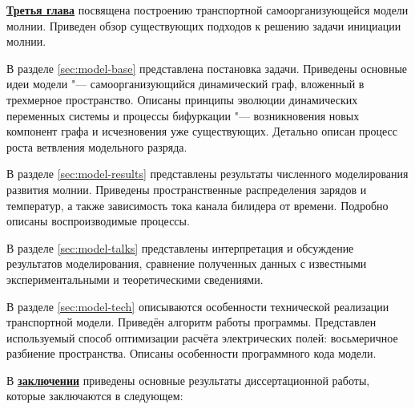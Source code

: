\underline{\textbf{Третья глава}} посвящена построению транспортной самоорганизующейся модели молнии. Приведен обзор существующих подходов к решению задачи инициации молнии.

В разделе \ref{sec:model-base} представлена постановка задачи. Приведены основные идеи модели "--- самоорганизующийся динамический граф, вложенный в трехмерное пространство. Описаны принципы эволюции динамических переменных системы и процессы бифуркации "--- возникновения новых компонент графа и исчезновения уже существующих. Детально описан процесс роста ветвления модельного разряда.

В разделе \ref{sec:model-results} представлены результаты численного моделирования развития молнии. Приведены пространственные распределения зарядов и температур, а также зависимость тока канала билидера от времени. Подробно описаны воспроизводимые процессы.

В разделе \ref{sec:model-talks} представлены интерпретация и обсуждение результатов моделирования, сравнение полученных данных с известными экспериментальными и теоретическими сведениями.

В разделе \ref{sec:model-tech} описываются особенности технической реализации транспортной модели. Приведён алгоритм работы программы. Представлен используемый способ оптимизации расчёта электрических полей: восьмеричное разбиение пространства. Описаны особенности программного кода модели.

\FloatBarrier
{}                                  %
В \underline{\textbf{заключении}} приведены основные результаты диссертационной работы, которые заключаются в следующем:




